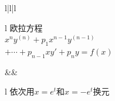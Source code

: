 \begin{table}[!htp]
\begin{tblr}{l|l|l}
		\begin{tblr}{l}
			欧拉方程 \\ %
			\(x^n y^{(n)} + p_1 x^{n-1} y^{(n-1)}\) \\
			\(+ \dotsb + p_{n-1} x y' + p_n y = f(x)\) \\
		\end{tblr}
			&& \begin{tblr}{l}
				依次用\(x=e^t\)和\(x=-e^t\)换元 \\
			\end{tblr}
		\\ \hline
	\end{tblr}
\end{table}
